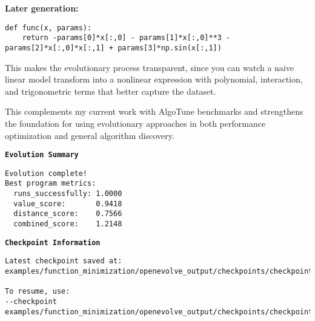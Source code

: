 \documentclass[11pt,letterpaper]{article}
\begin{document}
\textbf{Later generation:}
\begin{verbatim}
def func(x, params):
    return -params[0]*x[:,0] - params[1]*x[:,0]**3 - params[2]*x[:,0]*x[:,1] + params[3]*np.sin(x[:,1])
\end{verbatim}

This makes the evolutionary process transparent, since you can watch a naive linear model transform into a nonlinear expression with polynomial, interaction, and trigonometric terms that better capture the dataset.

\bigskip

This complements my current work with AlgoTune benchmarks and strengthens the foundation for using evolutionary approaches in both performance optimization and general algorithm discovery.

\bigskip

\textbf{\texttt{Evolution Summary}}  

\begin{verbatim}
Evolution complete!
Best program metrics:
  runs_successfully: 1.0000
  value_score:       0.9418
  distance_score:    0.7566
  combined_score:    1.2148
\end{verbatim}

\textbf{\texttt{Checkpoint Information}}  

\begin{verbatim}
Latest checkpoint saved at:
examples/function_minimization/openevolve_output/checkpoints/checkpoint_100

To resume, use:
--checkpoint examples/function_minimization/openevolve_output/checkpoints/checkpoint_100
\end{verbatim}
\end{document}
